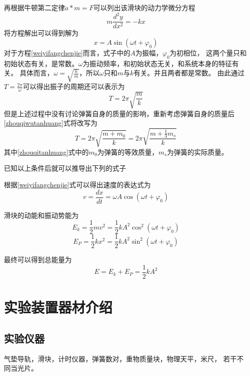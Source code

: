 \documentclass{ctexart}
\begin{document}
再根据牛顿第二定律$\ddot{a}*m=F$可以列出该滑块的动力学微分方程
\begin{equation}\label{niuerweifengfangchen}
  m\frac{d^2 y}{d x^2}=-kx 
\end{equation}
将方程解出可以得到解为
\begin{equation}\label{weiyifangchenjie}
  x=A\sin \left( \omega t+ {\varphi}_{0} \right)
\end{equation}
对于方程\ref{weiyifangchenjie}而言，式子中的$A$为振幅，${\varphi}_{0}$为初相位，
这两个量只和初始状态有关，是常数。$\omega$为振动频率，和初始状态无关，和系统本身的特征有关。
具体而言，$\omega = \sqrt{\frac{k}{m}} $，所以$\omega$只和$m$与$k$有关。并且两者都是常数。
由此通过$T=\frac{2\pi}{\omega}$可以得出振子的周期还可以表示为
\begin{equation}\label{zhouqiwutanhuang}
  T=2\pi \sqrt{\frac{m}{k}}
\end{equation}
但是上述过程中没有讨论弹簧自身的质量的影响，重新考虑弹簧自身的质量后\ref{zhouqiwutanhuang}式将改写为
\begin{equation}\label{zhouqitanhuang}
  T=2\pi \sqrt{\frac{m+m_{0}}{k}}=2\pi \sqrt{\frac{m+\frac{1}{3}m_{s}}{k}}
\end{equation}
其中\ref{zhouqitanhuang}式中的$m_{0}$为弹簧的等效质量，$m_{s}$为弹簧的实际质量。

已知以上条件后就可以推导出下列的式子

根据\ref{weiyifangchenjie}式可以得出速度的表达式为
\begin{equation}
  v=\frac{dx}{dt} =\omega A \cos \left( \omega t + {\varphi}_{0} \right)
\end{equation}

滑块的动能和振动势能为
\begin{equation}
  E_{k}=\frac{1}{2} mv^{2}=\frac{1}{2}kA^{2} {\cos}^{2}\left( \omega t + {\varphi}_{0} \right)
\end{equation}
\begin{equation}
  E_{P}=\frac{1}{2}kx^{2}=\frac{1}{2}kA^{2} {\sin}^{2} \left( \omega t + {\varphi}_{0} \right)
\end{equation}

最终可以得到总能量为
\begin{equation}
  E=E_{k}+E_{P}=\frac{1}{2}kA^{2}
\end{equation}

\section{实验装置器材介绍}
  \subsection{实验仪器}
  气垫导轨，滑块，计时仪器，弹簧数对，重物质量块，物理天平，米尺，
  若干不同当光片。
\end{document}
